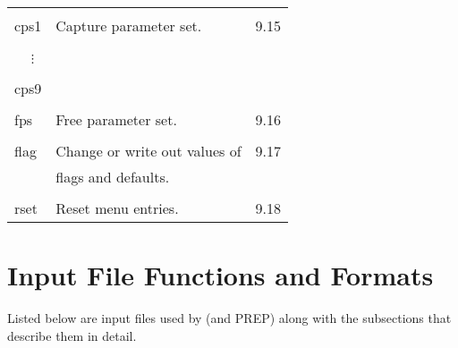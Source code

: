 \begin{center}
\begin{tabular}{lll}
\vspace{-3mm}& &\\
\hspace{1.5em}cps1   &  Capture parameter set.       &          \hspace{2em}9.15\\
\vspace{-7mm}& &\\
\hspace{1.5em}\ \ \,$\vdots$ & &\\
\vspace{-7mm}& &\\
\hspace{1.5em}cps9 & & \\
\vspace{-3mm}& &\\
\hspace{1.5em}fps     &    Free parameter set.       &          \hspace{2em}9.16\\
\vspace{-3mm}& &\\
\hspace{1.5em}flag    &  Change or write out values of &   \hspace{2em}9.17\\
           &   flags and defaults. &\\
\vspace{-3mm}& &\\
\hspace{1.5em}rset    &    Reset menu entries.        &     \hspace{2em}9.18
\end{tabular}
\end{center}

\newpage
\section{Input File Functions and Formats}  
     Listed below are input files used by \Mary (and PREP) along with the
subsections that describe them in detail.

